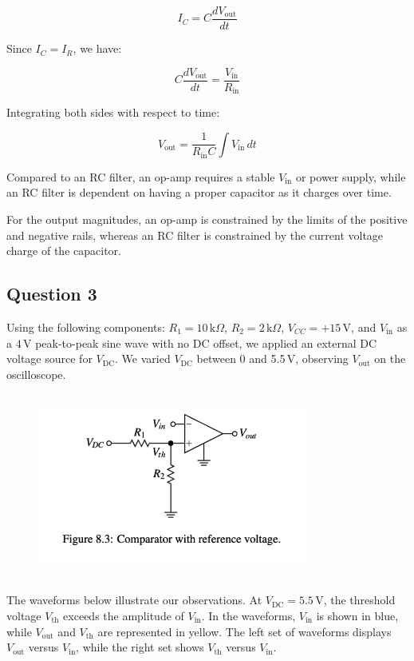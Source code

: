 \documentclass{article}
\begin{document}
\[
I_C = C \frac{dV_{\text{out}}}{dt}
\]

Since \( I_C = I_R \), we have:

\[
C \frac{dV_{\text{out}}}{dt} = \frac{V_{\text{in}}}{R_{\text{in}}}
\]

Integrating both sides with respect to time:

\[
V_{\text{out}} = \frac{1}{R_{\text{in}}C} \int V_{\text{in}} \, dt
\]

Compared to an RC filter, an op-amp requires a stable \( V_{\text{in}} \) or power supply, while an RC filter is dependent on having a proper capacitor as it charges over time.

For the output magnitudes, an op-amp is constrained by the limits of the positive and negative rails, whereas an RC filter is constrained by the current voltage charge of the capacitor.


\subsection*{Question 3}
Using the following components: 
\( R_1 = 10\,\text{k}\Omega \), \( R_2 = 2\,\text{k}\Omega \), \( V_{CC} = +15\,\text{V} \), 
and \( V_{\text{in}} \) as a \( 4\,\text{V} \) peak-to-peak sine wave with no DC offset, 
we applied an external DC voltage source for \( V_{\text{DC}} \). We varied \( V_{\text{DC}} \) 
between 0 and 5.5\,V, observing \( V_{\text{out}} \) on the oscilloscope.
\\ 
\\

\begin{figure}[H]
    \centering
    \includegraphics[width=0.8\textwidth]{img/Lab 8/3_1.png} %
    \caption{}
\end{figure}
\\

The waveforms below illustrate our observations. At \( V_{\text{DC}} = 5.5\,\text{V} \), 
the threshold voltage \( V_{\text{th}} \) exceeds the amplitude of \( V_{\text{in}} \). 
In the waveforms, \( V_{\text{in}} \) is shown in blue, while \( V_{\text{out}} \) 
and \( V_{\text{th}} \) are represented in yellow. The left set of waveforms displays 
\( V_{\text{out}} \) versus \( V_{\text{in}} \), while the right set shows \( V_{\text{th}} \) 
versus \( V_{\text{in}} \).
\end{document}
